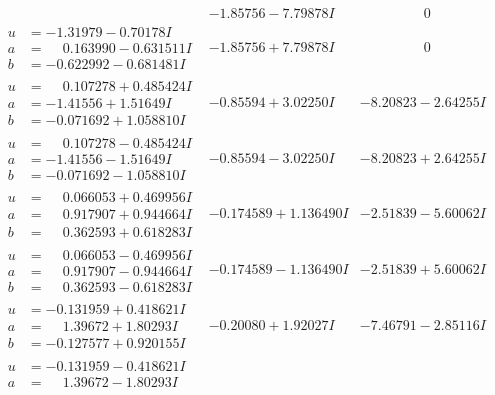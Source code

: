 \documentclass[1p]{elsarticle_modified}
\theoremstyle{definition}
\begin{document}
$$\begin{array}{c|c|c}
 & -1.85756 - 7.79878 I & \phantom{-0.000000 } 0 \\ \hline\begin{aligned}
u &= -1.31979 - 0.70178 I \\
a &= \phantom{-}0.163990 - 0.631511 I \\
b &= -0.622992 - 0.681481 I\end{aligned}
 & -1.85756 + 7.79878 I & \phantom{-0.000000 } 0 \\ \hline\begin{aligned}
u &= \phantom{-}0.107278 + 0.485424 I \\
a &= -1.41556 + 1.51649 I \\
b &= -0.071692 + 1.058810 I\end{aligned}
 & -0.85594 + 3.02250 I & -8.20823 - 2.64255 I \\ \hline\begin{aligned}
u &= \phantom{-}0.107278 - 0.485424 I \\
a &= -1.41556 - 1.51649 I \\
b &= -0.071692 - 1.058810 I\end{aligned}
 & -0.85594 - 3.02250 I & -8.20823 + 2.64255 I \\ \hline\begin{aligned}
u &= \phantom{-}0.066053 + 0.469956 I \\
a &= \phantom{-}0.917907 + 0.944664 I \\
b &= \phantom{-}0.362593 + 0.618283 I\end{aligned}
 & -0.174589 + 1.136490 I & -2.51839 - 5.60062 I \\ \hline\begin{aligned}
u &= \phantom{-}0.066053 - 0.469956 I \\
a &= \phantom{-}0.917907 - 0.944664 I \\
b &= \phantom{-}0.362593 - 0.618283 I\end{aligned}
 & -0.174589 - 1.136490 I & -2.51839 + 5.60062 I \\ \hline\begin{aligned}
u &= -0.131959 + 0.418621 I \\
a &= \phantom{-}1.39672 + 1.80293 I \\
b &= -0.127577 + 0.920155 I\end{aligned}
 & -0.20080 + 1.92027 I & -7.46791 - 2.85116 I \\ \hline\begin{aligned}
u &= -0.131959 - 0.418621 I \\
a &= \phantom{-}1.39672 - 1.80293 I \\

\end{aligned}
\end{array}$$
\end{document}
